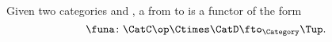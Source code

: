
\begin{ctdefinition}[T-Profunctors]
    \label{def:Tprofunctor}
    Given two categories \CatC and \CatD, a \emph{} from \CatC to \CatD is a functor of the form
    \begin{equation}
        \label{eq:Tprofunctors-def-1}
        \funa\colon \CatC\op \Ctimes \CatD \fto_{\Category} \Tup.
    \end{equation}
\end{ctdefinition}
